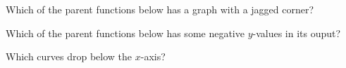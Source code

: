 \documentclass{ximera}
\begin{document}
\begin{question}
Which of the parent functions below has a graph with a jagged corner?

\begin{multipleChoice}
\end{multipleChoice}

\end{question}

\begin{question}
Which of the parent functions below has some negative $y$-values in its ouput?

\begin{multipleChoice}
\end{multipleChoice}
\begin{hint}
Which curves drop below the $x$-axis?
\end{hint}

\end{question}
\end{document}

